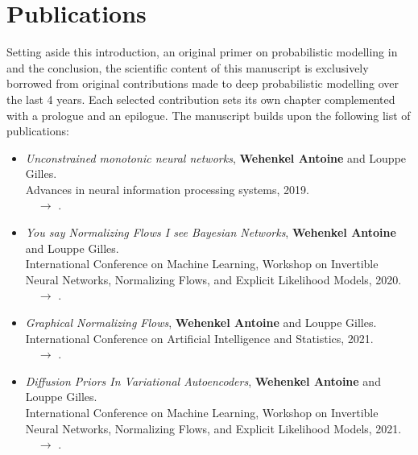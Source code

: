 \newpage
\section{Publications}
Setting aside this introduction, an original primer on probabilistic modelling in  and the conclusion,
the scientific content of this manuscript is exclusively borrowed from original contributions made to deep probabilistic modelling over the last 4 years.
Each selected contribution sets its own chapter complemented with a prologue and an epilogue.
The manuscript builds upon the following list of publications:

  \begin{tcolorbox}[breakable,width=\textwidth,title={List of publications}
      ,enhanced jigsaw, pad at break*=1mm, breakable,
      left=2mm, right=2mm, top=3mm, bottom=3mm,
      colback=LightBlue, boxrule=0pt, frame hidden,
      borderline ={0.5mm}{0mm}{Maroon}, arc=.5mm, coltitle=white, colbacktitle=Maroon]
  \begin{itemize}
  \item[] \citep{wehenkel_unconstrained_2019} \textit{Unconstrained monotonic neural networks},
  \textbf{Wehenkel Antoine} and Louppe Gilles.\\
  Advances in neural information processing systems, 2019.\\
  $\quad \rightarrow$ .

  \item[] \citep{wehenkel_you_2020} \textit{You say Normalizing Flows I see Bayesian Networks},
  \textbf{Wehenkel Antoine} and Louppe Gilles.\\
  International Conference on Machine Learning, Workshop on Invertible Neural Networks, Normalizing Flows, and Explicit Likelihood Models, 2020.\\
  $\quad \rightarrow$ .

  \item[] \citep{wehenkel2021graphical} \textit{Graphical Normalizing Flows},
  \textbf{Wehenkel Antoine} and Louppe Gilles.\\
  International Conference on Artificial Intelligence and Statistics, 2021.\\
  $\quad \rightarrow$ .

  \item[] \citep{wehenkel2021diffusion} \textit{Diffusion Priors In Variational Autoencoders},
  \textbf{Wehenkel Antoine} and Louppe Gilles.\\
  International Conference on Machine Learning, Workshop on Invertible Neural Networks, Normalizing Flows, and Explicit Likelihood Models, 2021.\\
  $\quad \rightarrow$ .


\end{itemize}
\end{tcolorbox}
